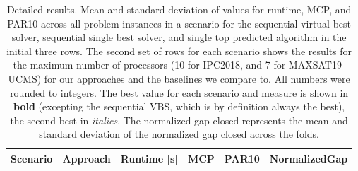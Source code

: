 \begin{table}
\begin{center}
    {\caption[Detailed Results: Runtime, MCP, PAR10, and Normalized Gap Closed for $AS_{p_{\cap}}$ vs. $AS_{kl}$ for IPC2018 and MAXSAT19-UCMS Scenarios]{Detailed results. Mean and standard deviation of values for runtime, MCP, and PAR10 across all problem instances in a scenario for the sequential virtual best solver, sequential single best solver, and single top predicted algorithm in the initial three rows. The second set of rows for each scenario shows the results for the maximum number of processors (10 for IPC2018, and 7 for MAXSAT19-UCMS) for our approaches and the baselines we compare to. All numbers were rounded to integers. The best value for each scenario and measure is shown in \textbf{bold} (excepting the sequential VBS, which is by definition always the best), the second best in \textit{italics}. The normalized gap closed represents the mean and standard deviation of the normalized gap closed across the folds.}\label{tab:summary5-ipc-max}}
    \scriptsize\begin{tabular}{clcccc}
    \toprule
        Scenario & Approach & Runtime [s] & MCP & PAR10 & NormalizedGap\\
    \midrule
    

\end{tabular}
\end{center}
\end{table}
